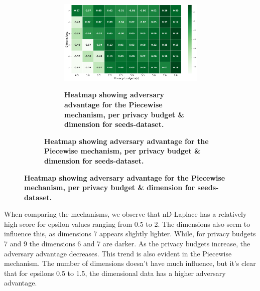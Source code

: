 {\begin{figure}[H]
\begin{subfigure}[b]{0.75\textwidth}
    \begin{subfigure}[c]{1\textwidth}
      \caption{\textbf{Heatmap showing adversary advantage for the Piecewise mechanism, per privacy budget \& dimension for seeds-dataset.}}
      \includegraphics[width=1\textwidth]{Results/nd-laplace/piecewise/seeds-dataset/attack_adv.png}
      \label{fig:privacy_seeds-dataset_adversial_advantage_piecewise}
    \end{subfigure}
  \end{subfigure}
\end{figure}
When comparing the mechanisms, we observe that nD-Laplace has a relatively high score for epsilon values ranging from 0.5 to 2. The dimensions also seem to influence this, as dimensions  7 appears slightly lighter. While, for privacy budgets 7 and 9 the dimensions 6 and 7 are  darker. As the privacy budgets increase, the adversary advantage decreases. This trend is also evident in the Piecewise mechanism. The number of dimensions doesn't have much influence, but it's clear that for epsilons 0.5 to 1.5, the dimensional data has a higher adversary advantage.

}
